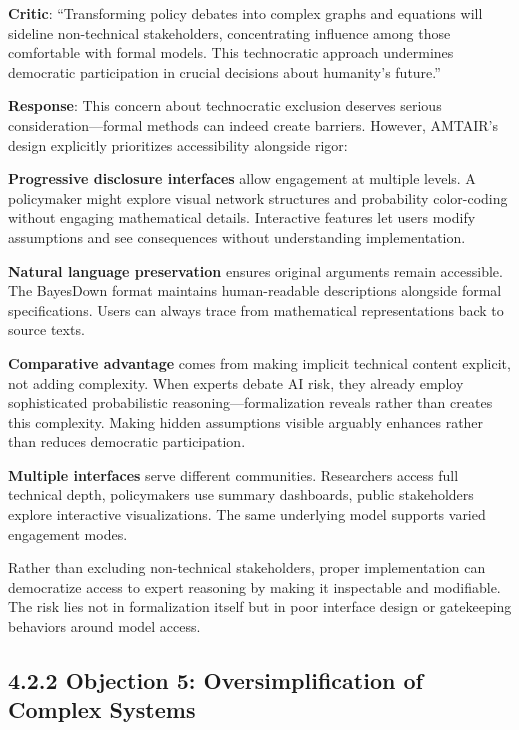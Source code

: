 \documentclass[
  11pt,
  letterpaper,
]{book}
\begin{document}
\textbf{Critic}: ``Transforming policy debates into complex graphs and
equations will sideline non-technical stakeholders, concentrating
influence among those comfortable with formal models. This technocratic
approach undermines democratic participation in crucial decisions about
humanity's future.''

\textbf{Response}: This concern about technocratic exclusion deserves
serious consideration---formal methods can indeed create barriers.
However, AMTAIR's design explicitly prioritizes accessibility alongside
rigor:

\textbf{Progressive disclosure interfaces} allow engagement at multiple
levels. A policymaker might explore visual network structures and
probability color-coding without engaging mathematical details.
Interactive features let users modify assumptions and see consequences
without understanding implementation.

\textbf{Natural language preservation} ensures original arguments remain
accessible. The BayesDown format maintains human-readable descriptions
alongside formal specifications. Users can always trace from
mathematical representations back to source texts.

\textbf{Comparative advantage} comes from making implicit technical
content explicit, not adding complexity. When experts debate AI risk,
they already employ sophisticated probabilistic
reasoning---formalization reveals rather than creates this complexity.
Making hidden assumptions visible arguably enhances rather than reduces
democratic participation.

\textbf{Multiple interfaces} serve different communities. Researchers
access full technical depth, policymakers use summary dashboards, public
stakeholders explore interactive visualizations. The same underlying
model supports varied engagement modes.

Rather than excluding non-technical stakeholders, proper implementation
can democratize access to expert reasoning by making it inspectable and
modifiable. The risk lies not in formalization itself but in poor
interface design or gatekeeping behaviors around model access.

\subsection*{4.2.2 Objection 5: Oversimplification of Complex
Systems}\label{sec-oversimplification}
\end{document}
